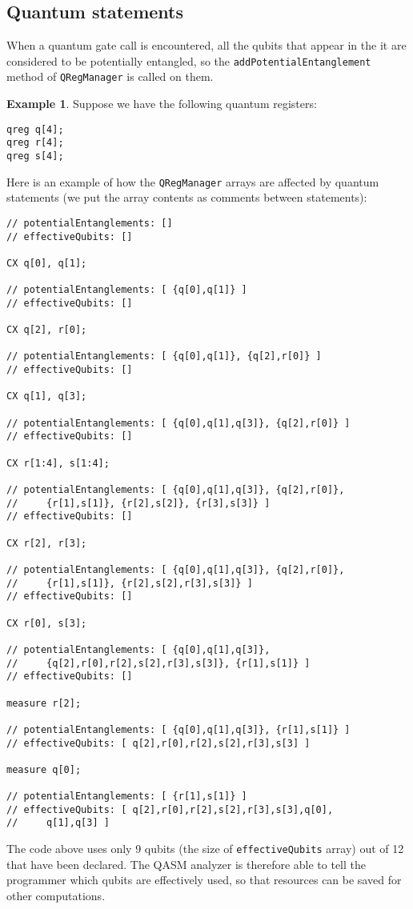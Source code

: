 \documentclass[12pt,a4paper]{report}
\theoremstyle{definition}
\theoremstyle{definition}
\newtheorem{example}{Example}[section]
\theoremstyle{definition}
\begin{document}
\subsection{Quantum statements}
When a quantum gate call is encountered, all the qubits that appear in the it are considered to be potentially entangled, so the \texttt{addPotentialEntanglement} method of \texttt{QRegManager} is called on them.
\begin{example}
Suppose we have the following quantum registers:
\begin{lstlisting}
qreg q[4];
qreg r[4];
qreg s[4];
\end{lstlisting}
Here is an example of how the \texttt{QRegManager} arrays are affected by quantum statements (we put the array contents as comments between statements):
\begin{lstlisting}
// potentialEntanglements: []
// effectiveQubits: []

CX q[0], q[1];

// potentialEntanglements: [ {q[0],q[1]} ]
// effectiveQubits: []

CX q[2], r[0];

// potentialEntanglements: [ {q[0],q[1]}, {q[2],r[0]} ]
// effectiveQubits: []

CX q[1], q[3];

// potentialEntanglements: [ {q[0],q[1],q[3]}, {q[2],r[0]} ]
// effectiveQubits: []

CX r[1:4], s[1:4];

// potentialEntanglements: [ {q[0],q[1],q[3]}, {q[2],r[0]},
//     {r[1],s[1]}, {r[2],s[2]}, {r[3],s[3]} ]
// effectiveQubits: []

CX r[2], r[3];

// potentialEntanglements: [ {q[0],q[1],q[3]}, {q[2],r[0]},
//     {r[1],s[1]}, {r[2],s[2],r[3],s[3]} ]
// effectiveQubits: []

CX r[0], s[3];

// potentialEntanglements: [ {q[0],q[1],q[3]},
//     {q[2],r[0],r[2],s[2],r[3],s[3]}, {r[1],s[1]} ]
// effectiveQubits: []

measure r[2];

// potentialEntanglements: [ {q[0],q[1],q[3]}, {r[1],s[1]} ]
// effectiveQubits: [ q[2],r[0],r[2],s[2],r[3],s[3] ]

measure q[0];

// potentialEntanglements: [ {r[1],s[1]} ]
// effectiveQubits: [ q[2],r[0],r[2],s[2],r[3],s[3],q[0],
//     q[1],q[3] ]
\end{lstlisting}
The code above uses only 9 qubits (the size of \texttt{effectiveQubits} array) out of 12 that have been declared. The QASM analyzer is therefore able to tell the programmer which qubits are effectively used, so that resources can be saved for other computations.
\end{example}
\end{document}
